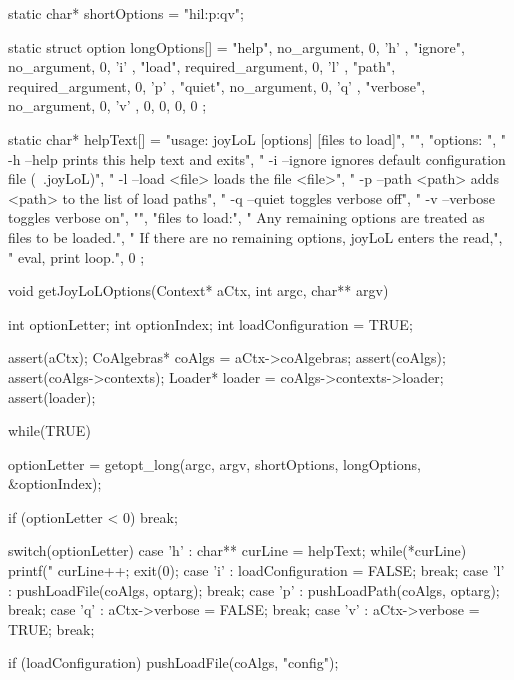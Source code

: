 \starttyping
static char* shortOptions = "hil:p:qv";

static struct option longOptions[] = {
  { "help",    no_argument,       0, 'h' },
  { "ignore",  no_argument,       0, 'i' },
  { "load",    required_argument, 0, 'l' },
  { "path",    required_argument, 0, 'p' },
  { "quiet",   no_argument,       0, 'q' },
  { "verbose", no_argument,       0, 'v' },
  { 0, 0, 0, 0}
};

static char* helpText[] = {
  "usage: joyLoL [options] [files to load]",
  "",
  "options: ",
  " -h --help        prints this help text and exits",
  " -i --ignore      ignores default configuration file (~.joyLoL)",
  " -l --load <file> loads the file <file>",
  " -p --path <path> adds <path> to the list of load paths",
  " -q --quiet       toggles verbose off",
  " -v --verbose     toggles verbose on",
  "",
  "files to load:",
  "  Any remaining options are treated as files to be loaded.",
  "  If there are no remaining options, joyLoL enters the read,",
  "  eval, print loop.",
  0
};


void getJoyLoLOptions(Context* aCtx, int argc, char** argv) {
  int optionLetter;
  int optionIndex;
  int loadConfiguration = TRUE;

  assert(aCtx);
  CoAlgebras* coAlgs = aCtx->coAlgebras;
  assert(coAlgs);
  assert(coAlgs->contexts);
  Loader* loader = coAlgs->contexts->loader;
  assert(loader);

  while(TRUE) {
    optionLetter = getopt_long(argc, argv,
                               shortOptions, longOptions,
                               &optionIndex);

    if (optionLetter < 0) break;

    switch(optionLetter) {
      case 'h' : {
        char** curLine = helpText;
        while(*curLine) {
          printf("%
          curLine++;
        }
        exit(0);
      }
      case 'i' :
        loadConfiguration = FALSE;
        break;
      case 'l' :
        pushLoadFile(coAlgs, optarg);
        break;
      case 'p' :
        pushLoadPath(coAlgs, optarg);
        break;
      case 'q' :
        aCtx->verbose = FALSE;
        break;
      case 'v' :
        aCtx->verbose = TRUE;
        break;
    }
  }

  if (loadConfiguration) pushLoadFile(coAlgs, "config");
}
\stoptyping